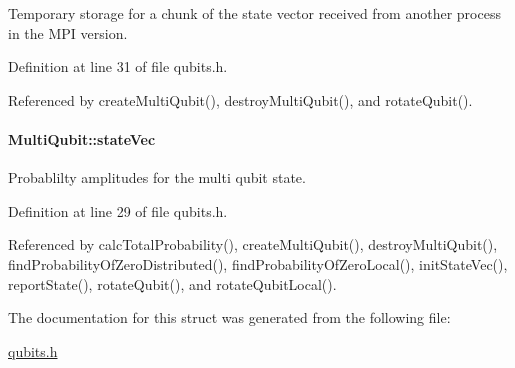 Temporary storage for a chunk of the state vector received from another process in the MPI version. 

Definition at line 31 of file qubits.h.

Referenced by createMultiQubit(), destroyMultiQubit(), and rotateQubit().\hypertarget{structMultiQubit_a45483190d6b01ef6b2f98f2bec9ab94f}{
\paragraph[{stateVec}]{ {\bf MultiQubit::stateVec}}\hfill}
\label{structMultiQubit_a45483190d6b01ef6b2f98f2bec9ab94f}


Probablilty amplitudes for the multi qubit state. 

Definition at line 29 of file qubits.h.

Referenced by calcTotalProbability(), createMultiQubit(), destroyMultiQubit(), findProbabilityOfZeroDistributed(), findProbabilityOfZeroLocal(), initStateVec(), reportState(), rotateQubit(), and rotateQubitLocal().

The documentation for this struct was generated from the following file:\begin{DoxyCompactItemize}
\item 
\hyperlink{qubits_8h}{qubits.h}\end{DoxyCompactItemize}
